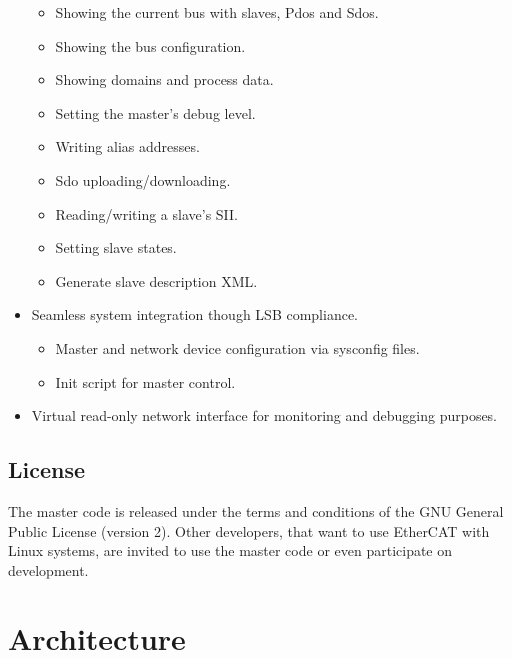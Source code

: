 \documentclass[a4paper,12pt,BCOR6mm,bibtotoc,idxtotoc]{scrbook}
\begin{document}
\begin{itemize}
\begin{itemize}
  \item Showing the current bus with slaves, Pdos and Sdos.
  \item Showing the bus configuration.
  \item Showing domains and process data.
  \item Setting the master's debug level.
  \item Writing alias addresses.
  \item Sdo uploading/downloading.
  \item Reading/writing a slave's SII.
  \item Setting slave states.
  \item Generate slave description XML.

  \end{itemize}

\item Seamless system integration though LSB compliance.

  \begin{itemize}

  \item Master and network device configuration via sysconfig files.

  \item Init script for master control.

  \end{itemize}

\item Virtual read-only network interface for monitoring and debugging
  purposes.

\end{itemize}


\section{License}
\label{sec:license}

The master code is released under the terms and conditions of the GNU
General Public License \cite{gpl} (version 2). Other
developers, that want to use EtherCAT with Linux systems, are invited
to use the master code or even participate on development.


\chapter{Architecture}
\label{sec:arch}
\end{document}

